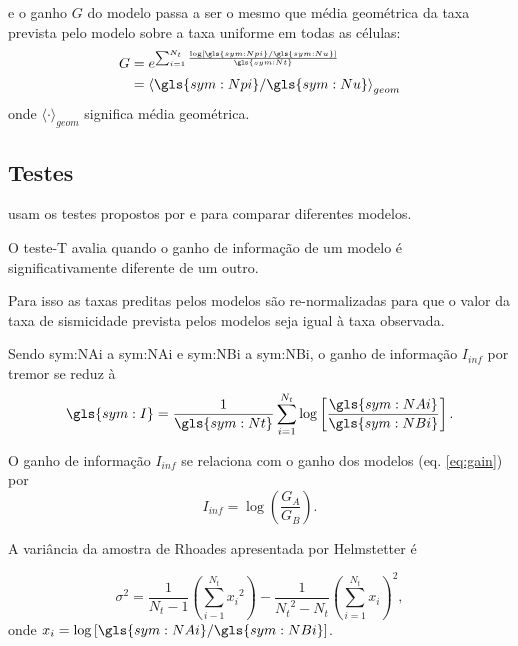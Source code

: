 e o ganho $G$ do modelo passa a ser o mesmo que média geométrica da taxa prevista pelo modelo sobre 
a taxa uniforme em todas as células:
\begin{equation}
	\ensuremath{
	\begin{align}
		G & = e^{\sum_{i = 1}^{N_t}
					\frac{\log \left[  \gls{sym:Npi} / \gls{sym:Nu}  \right]}
						 {\gls{sym:Nt}}
			  } \\
		  & = {\langle  \gls{sym:Npi} / \gls{sym:Nu}  \rangle}_{geom}
	\end{align}}
	\label{eq:G}
\end{equation}
onde $\langle\cdot\rangle_{geom}$ significa média geométrica.

\subsection{Testes}

\citet{helmstetter_2012} usam os testes propostos por \citet{schorlemmer_2007}
e \citet{rhoades_2011} para comparar diferentes modelos.

O teste-T avalia quando o ganho de informação de um modelo é significativamente diferente
de um outro.

Para isso as taxas preditas pelos modelos são re-normalizadas para que o valor da taxa de sismicidade
prevista pelos modelos seja igual à taxa observada.

Sendo \gls{sym:NAi} a \glsdesc{sym:NAi} e \gls{sym:NBi} a \glsdesc{sym:NBi}, o ganho de informação $I_{inf}$
por tremor se reduz à 
\begin{equation}
	\ensuremath{
		\gls{sym:I} = \frac{1}{\gls{sym:Nt}} 
					  \sum_{i = 1}^{N_t}\log\left[ \frac{\gls{sym:NAi}}
					  								  {\gls{sym:NBi}}  \right].
	}
	\label{eq:gain_info}
\end{equation}

O ganho de informação $I_{inf}$ se relaciona com o ganho dos modelos (eq. \eqref{eq:gain}) por
\begin{equation}
	\ensuremath{
		I_{inf} = \log\left(\frac{G_A}{G_B}\right).
	}
	\label{eq:gain_info_G}
\end{equation}


A variância da amostra de Rhoades apresentada por Helmstetter é 

\begin{equation}
	\ensuremath{
		\sigma^2 = 	\frac{1}{N_t - 1}
					{\left(
					\sum_{i-1}^{N_t}
						{x_i}^2 
					\right)}
					- 
					\frac{1}{{N_t}^2 - N_t}
					{\left(
						\sum_{i=1}^{N_t}{x_i}
					\right)}^2,
	}
	\label{eq:var}
\end{equation}
onde $x_i = \log\left[ \gls{sym:NAi} / \gls{sym:NBi}  \right]$.

